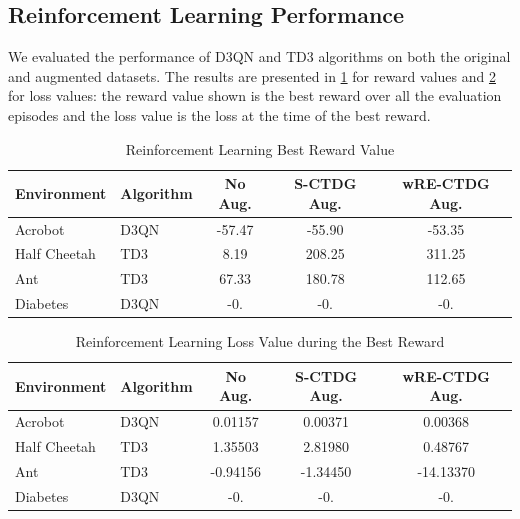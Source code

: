 \subsection{Reinforcement Learning Performance}

We evaluated the performance of D3QN and TD3 algorithms on both the
original and augmented datasets. The results are presented
in \ref{tab:rl_reward} for reward values and \ref{tab:rl_loss}
for loss values: the reward value shown is the best reward
over all the evaluation episodes and 
the loss value is the loss at the time of the best reward.

\begin{table}[h]
    \centering
    \begin{tabular}{@{}llccc@{}}
        \toprule
        \textbf{Environment} & \textbf{Algorithm} & \textbf{No Aug.} & \textbf{S-CTDG Aug.} & \textbf{wRE-CTDG Aug.} \\ \midrule
        Acrobot              & D3QN               & -57.47           & -55.90                 & -53.35               \\
        Half Cheetah         & TD3                & 8.19             & 208.25                 & 311.25               \\
        Ant                  & TD3                & 67.33            & 180.78                 & 112.65               \\
        Diabetes             & D3QN               & -0.              & -0.                    & -0.                  \\ \bottomrule
    \end{tabular}
    \caption{Reinforcement Learning Best Reward Value}
    \label{tab:rl_reward}
\end{table}

\begin{table}[h]
    \centering
    \begin{tabular}{@{}llccc@{}}
        \toprule
        \textbf{Environment} & \textbf{Algorithm} & \textbf{No Aug.} & \textbf{S-CTDG Aug.} & \textbf{wRE-CTDG Aug.} \\ \midrule
        Acrobot              & D3QN               & 0.01157          & 0.00371                & 0.00368              \\
        Half Cheetah         & TD3                & 1.35503          & 2.81980                & 0.48767              \\
        Ant                  & TD3                & -0.94156         & -1.34450               & -14.13370            \\
        Diabetes             & D3QN               & -0.              & -0.                    & -0.                  \\ \bottomrule
    \end{tabular}
    \caption{Reinforcement Learning Loss Value during the Best Reward}
    \label{tab:rl_loss}
\end{table}

